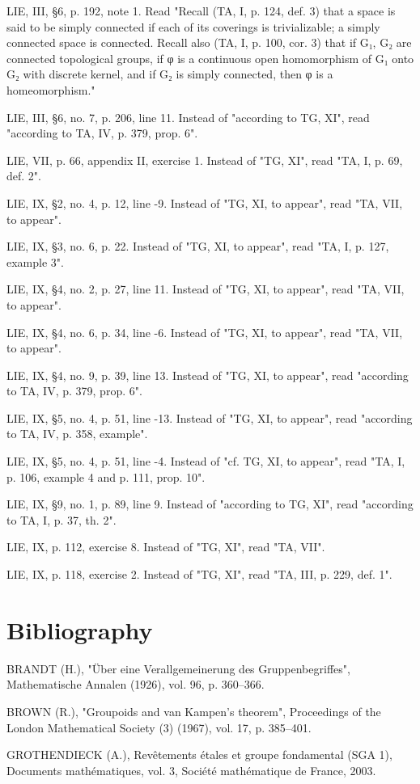 \documentclass[12pt,a4paper,oneside]{book}
\newcommand{\specialchapter}[1]{%
  \chapter*{#1}%
  \phantomsection
  \addcontentsline{toc}{chapter}{#1}%
}
\begin{document}
LIE, III, §6, p. 192, note 1. Read "Recall (TA, I, p. 124, def. 3) that a space is said to be simply connected if each of its coverings is trivializable; a simply connected space is connected. Recall also (TA, I, p. 100, cor. 3) that if G₁, G₂ are connected topological groups, if φ is a continuous open homomorphism of G₁ onto G₂ with discrete kernel, and if G₂ is simply connected, then φ is a homeomorphism."

LIE, III, §6, no. 7, p. 206, line 11. Instead of "according to TG, XI", read "according to TA, IV, p. 379, prop. 6".

LIE, VII, p. 66, appendix II, exercise 1. Instead of "TG, XI", read "TA, I, p. 69, def. 2".

LIE, IX, §2, no. 4, p. 12, line -9. Instead of "TG, XI, to appear", read "TA, VII, to appear".

LIE, IX, §3, no. 6, p. 22. Instead of "TG, XI, to appear", read "TA, I, p. 127, example 3".

LIE, IX, §4, no. 2, p. 27, line 11. Instead of "TG, XI, to appear", read "TA, VII, to appear".

LIE, IX, §4, no. 6, p. 34, line -6. Instead of "TG, XI, to appear", read "TA, VII, to appear".

LIE, IX, §4, no. 9, p. 39, line 13. Instead of "TG, XI, to appear", read "according to TA, IV, p. 379, prop. 6".

LIE, IX, §5, no. 4, p. 51, line -13. Instead of "TG, XI, to appear", read "according to TA, IV, p. 358, example".

LIE, IX, §5, no. 4, p. 51, line -4. Instead of "cf. TG, XI, to appear", read "TA, I, p. 106, example 4 and p. 111, prop. 10".

LIE, IX, §9, no. 1, p. 89, line 9. Instead of "according to TG, XI", read "according to TA, I, p. 37, th. 2".

LIE, IX, p. 112, exercise 8. Instead of "TG, XI", read "TA, VII".

LIE, IX, p. 118, exercise 2. Instead of "TG, XI", read "TA, III, p. 229, def. 1".

\specialchapter{Bibliography}

BRANDT (H.), "Über eine Verallgemeinerung des Gruppenbegriffes", Mathematische Annalen (1926), vol. 96, p. 360--366.

BROWN (R.), "Groupoids and van Kampen's theorem", Proceedings of the London Mathematical Society (3) (1967), vol. 17, p. 385--401.

GROTHENDIECK (A.), Revêtements étales et groupe fondamental (SGA 1), Documents mathématiques, vol. 3, Société mathématique de France, 2003.
\end{document}
